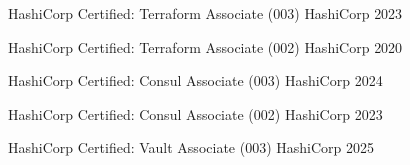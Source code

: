 \begin{cvhonors}
  \cvhonor
    {HashiCorp Certified: Terraform Associate (003)} %
    {HashiCorp} %
    {} %
    {2023} %

  \cvhonor
    {HashiCorp Certified: Terraform Associate (002)} %
    {HashiCorp} %
    {} %
    {2020} %

  \cvhonor
    {HashiCorp Certified: Consul Associate (003)} %
    {HashiCorp} %
    {} %
    {2024} %

  \cvhonor
    {HashiCorp Certified: Consul Associate (002)} %
    {HashiCorp} %
    {} %
    {2023} %

  \cvhonor
    {HashiCorp Certified: Vault Associate (003)} %
    {HashiCorp} %
    {} %
    {2025} %
  \\[-0.8\baselineskip]

\end{cvhonors}

